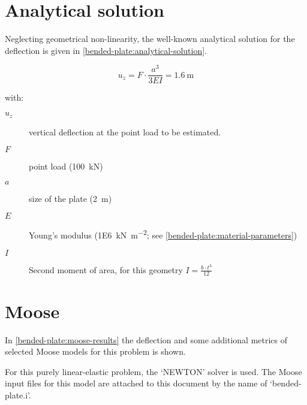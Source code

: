 \section{Analytical solution}
\label{bended-plate:sec:analytical-solution}

Neglecting geometrical non-linearity, the well-known analytical solution for
the deflection is given in \autoref{bended-plate:analytical-solution}.

\begin{equation}
    \label{bended-plate:analytical-solution}
    u_z = F \cdot \frac{a ^ 3}{3EI} = \qty{1.6}{\metre}
\end{equation}

\begin{samepage}
    with:
    \begin{description}
        \item[$u_{z}$] vertical deflection at the point load to be estimated.
        \item[$F$] point load (\qty{100}{\kilo\newton})
        \item[$a$] size of the plate (\qty{2}{\metre})
        \item[$E$] Young's modulus (\qty[per-mode = symbol]{1E6}{\kilo\newton\per\square\metre}; see \autoref{bended-plate:material-parameters})
        \item[$I$] Second moment of area, for this geometry $I = \frac{b \cdot t^3}{12}$
    \end{description}
\end{samepage}

\section{Moose}
\label{bended-plate:sec:moose}

In \autoref{bended-plate:moose-results} the deflection and some additional
metrics of selected Moose models for this problem is shown.

For this purely linear-elastic problem, the ‘NEWTON’ solver is used. The Moose
input files for this model are attached to this document by the name of
‘bended-plate.i’.


